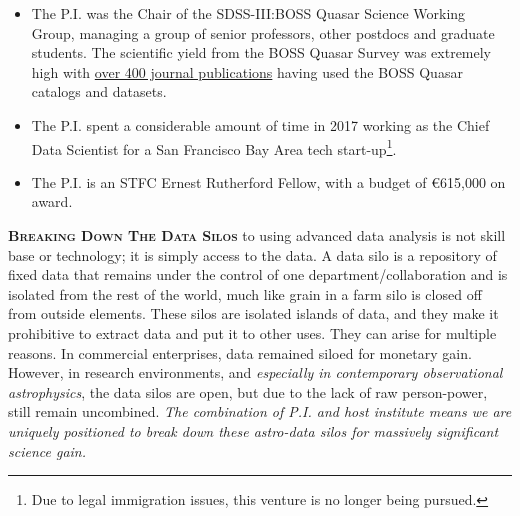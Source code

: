 \documentclass[oneside, a4paper, onecolumn, 11pt]{article}
\begin{document}
\begin{itemize}
\item The P.I. was the Chair
of the SDSS-III:BOSS Quasar Science Working Group, managing a
group of senior professors, other postdocs and graduate students.
The scientific yield from the BOSS Quasar Survey was extremely high 
with \href{https://tinyurl.com/ycxd8lb6}{over 400 journal publications} having 
used the BOSS Quasar catalogs and datasets.

\item The P.I. spent a considerable amount of time in 2017 working as the
Chief Data Scientist for a San Francisco Bay Area 
tech start-up\footnote{Due to legal immigration issues, this venture is no longer being pursued.}. 

\item The P.I. is an STFC Ernest Rutherford Fellow, with a budget of \euro615,000 on award. 
\end{itemize}


\smallskip
\smallskip
\noindent
\textbf{\textsc{Breaking Down The Data Silos}}
to using advanced data analysis is not skill base or technology; it is
simply access to the data.  A data silo is a repository of fixed data
that remains under the control of one department/collaboration and is
isolated from the rest of the world, much like grain in a farm silo is
closed off from outside elements. These silos are isolated islands of
data, and they make it prohibitive to extract data and put it to other
uses. They can arise for multiple reasons. In commercial enterprises,
data remained siloed for monetary gain.  However, in research
environments, and {\it especially in contemporary observational
astrophysics}, the data silos are open, but due to the lack of raw
person-power, still remain uncombined. {\it The combination 
of P.I. and host institute means we are uniquely positioned to 
break down these astro-data silos for massively significant 
science gain.}
\end{document}
